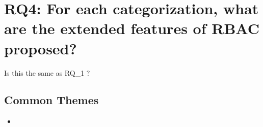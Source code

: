 \documentclass[letterpaper,10pt,english]{sphinxmanual}
\begin{document}
\chapter{RQ4: For each categorization, what are the extended features of RBAC proposed?}
\label{research_questions/RQ_4::doc}\label{research_questions/RQ_4:rq4-for-each-categorization-what-are-the-extended-features-of-rbac-proposed}
Is this the same as RQ\_1 ?


\section{Common Themes}
\label{research_questions/RQ_4:common-themes}\begin{itemize}
\item {} 
\end{itemize}
\end{document}
